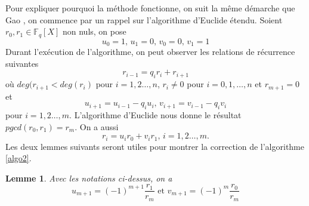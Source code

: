 \documentclass{article}
\newtheorem{lemma}{Lemme}
\theoremstyle{definition}
\theoremstyle{remark}
\begin{document}
\vspace{0.5cm}

Pour expliquer pourquoi la méthode fonctionne, on suit la même démarche que Gao \cite{Gao2003}, on commence par un rappel sur l'algorithme d'Euclide étendu. Soient $r_{0}, r_{1} \in \mathbb{F}_q[X]$ non nuls, on pose
\[ u_{0} = 1 \text{, } u_{1} = 0 \text{, } v_{0} = 0 \text{, } v_{1} = 1 \]
Durant l'exécution de l'algorithme, on peut observer les relations de récurrence suivantes
\begin{equation}
\label{eq:euc1}
    r_{i-1} = q_{i}r_{i} + r_{i+1}
\end{equation}
où $deg(r_{i+1} < deg(r_i)$ pour $i = 1, 2 \dots, n$, $r_i \ne 0$ pour $i = 0, 1, \dots, n$ et $r_{m+1} = 0$ et
\begin{equation}
\label{eq:euc2}
    u_{i+1} = u_{i-1} - q_{i}u_{i} \text{, } v_{i+1} = v_{i-1} - q_{i}v_{i}
\end{equation}
pour $i = 1, 2 \dots, m$.
L'algorithme d'Euclide nous donne le résultat $pgcd(r_{0}, r_{1}) = r_m$. On a aussi
\begin{equation}
\label{eq:euc3}
    r_i = u_{i}r_{0} + v_{i}r_{1} \text{, } i = 1, 2 \dots, m.
\end{equation}
Les deux lemmes suivants seront utiles pour montrer la correction de l'algorithme \ref{algo2}.

\begin{lemma}
\label{lem1}
    Avec les notations ci-dessus, on a
    \[ u_{m+1} = (-1)^{m+1} \frac{r_{1}}{r_{m}} \text{ et } v_{m+1} = (-1)^{m} \frac{r_{0}}{r_{m}} \]
\end{lemma}
\end{document}
